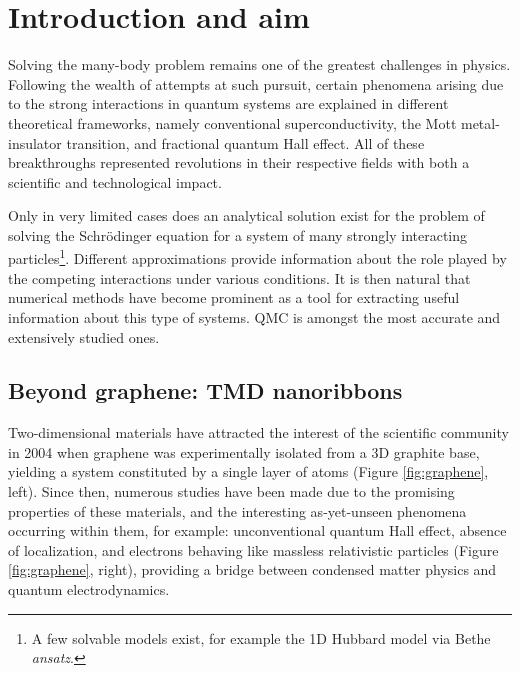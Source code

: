 \documentclass[10pt, twocolumn, twoside]{article}
\begin{document}
\section{Introduction and aim}

Solving the many-body problem remains one of the greatest challenges in physics. Following the wealth of attempts at such pursuit, certain phenomena arising due to the strong interactions in quantum systems are explained in different theoretical frameworks, namely conventional superconductivity, the Mott metal-insulator transition, and fractional quantum Hall effect. All of these breakthroughs represented revolutions in their respective fields with both a scientific and technological impact.\par

Only in very limited cases does an analytical solution exist for the problem of solving the Schr\"odinger equation for a system of many strongly interacting particles\footnote{A few solvable models exist, for example the 1D Hubbard model via Bethe \emph{ansatz}.}. Different approximations provide information about the role played by the competing interactions under various conditions. It is then natural that numerical methods have become prominent as a tool for extracting useful information about this type of systems. QMC is amongst the most accurate and extensively studied ones.\par


\subsection*{Beyond graphene: TMD nanoribbons}

Two-dimensional materials have attracted the interest of the scientific community in 2004 when graphene was experimentally isolated from a 3D graphite base, yielding a system constituted by a single layer of atoms (Figure  \ref{fig:graphene}, left). Since then, numerous studies have been made due to the promising properties of these materials, and the interesting as-yet-unseen phenomena occurring within them, for example: unconventional quantum Hall effect, absence of localization, and electrons behaving like massless relativistic particles (Figure \ref{fig:graphene}, right), providing a bridge between condensed matter physics and quantum electrodynamics\cite{graphene}.
\end{document}
